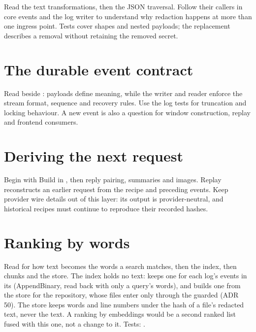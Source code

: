 Read the text transformations, then the JSON traversal. Follow their callers in core events and the log writer to understand why redaction happens at more than one ingress point. Tests cover shapes and nested payloads; the replacement describes a removal without retaining the removed secret.



\chapter{The durable event contract}

Read  beside : payloads define meaning, while the writer and reader enforce the stream format, sequence and recovery rules. Use the log tests for truncation and locking behaviour. A new event is also a question for window construction, replay and frontend consumers.



\chapter{Deriving the next request}

Begin with Build in , then reply pairing, summaries and images. Replay reconstructs an earlier request from the recipe and preceding events. Keep provider wire details out of this layer: its output is provider-neutral, and historical recipes must continue to reproduce their recorded hashes.







\chapter{Ranking by words}

Read  for how text becomes the words a search matches, then the index, then chunks and the store. The index holds no text:  keeps one for each log's events in its  (AppendBinary, read back with only a query's words), and  builds one from the store for the repository, whose files enter only through the guarded  (ADR 50). The store keeps words and line numbers under the hash of a file's redacted text, never the text. A ranking by embeddings would be a second ranked list fused with this one, not a change to it. Tests: .


